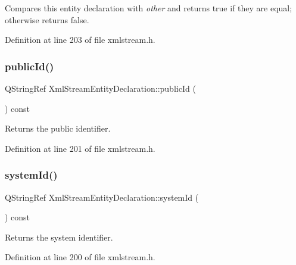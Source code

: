 Compares this entity declaration with {\itshape other} and returns {\ttfamily true} if they are equal; otherwise returns {\ttfamily false}. 

Definition at line 203 of file xmlstream.\+h.

\mbox{\label{class_xml_stream_entity_declaration_a94f13960262228875b5a6def3fdb7325}} 
\subsubsection{\texorpdfstring{public\+Id()}{publicId()}}
{\footnotesize\ttfamily Q\+String\+Ref Xml\+Stream\+Entity\+Declaration\+::public\+Id (\begin{DoxyParamCaption}{ }\end{DoxyParamCaption}) const\hspace{0.3cm}{\ttfamily [inline]}}

Returns the public identifier. 

Definition at line 201 of file xmlstream.\+h.

\mbox{\label{class_xml_stream_entity_declaration_a10c98ee5aa7f0c64d531db9674c8d981}} 
\subsubsection{\texorpdfstring{system\+Id()}{systemId()}}
{\footnotesize\ttfamily Q\+String\+Ref Xml\+Stream\+Entity\+Declaration\+::system\+Id (\begin{DoxyParamCaption}{ }\end{DoxyParamCaption}) const\hspace{0.3cm}{\ttfamily [inline]}}

Returns the system identifier. 

Definition at line 200 of file xmlstream.\+h.

\mbox{\label{class_xml_stream_entity_declaration_aeea2611b6e86540eb5d41486e001c03f}} 
